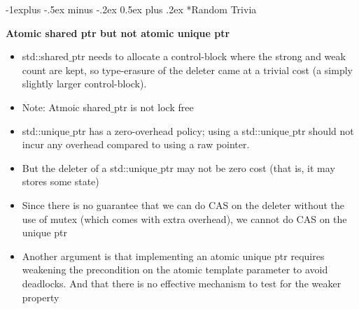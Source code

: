 \documentclass[10pt, landscape]{article}
\makeatletter
\renewcommand{\subsection}{\@startsection{subsection}{2}{0mm}%
                                {-1explus -.5ex minus -.2ex}%
                                {0.5ex plus .2ex}%
                                {\normalfont\normalsize\bfseries}}
\makeatother
\begin{document}
\begin{multicols}{4}
\subsection*{Random Trivia}

\textbf{Atomic shared ptr but not atomic unique ptr} \\
\begin{itemize}
    \item std::shared$\_$ptr needs to allocate a control-block where the strong and weak count are kept, so type-erasure of the deleter came at a trivial cost (a simply slightly larger control-block).
    \item Note: Atmoic shared$\_$ptr is not lock free
    \item std::unique$\_$ptr has a zero-overhead policy; using a std::unique$\_$ptr should not incur any overhead compared to using a raw pointer.
    \item But the deleter of a std::unique$\_$ptr may not be zero cost (that is, it may stores some state)
    \item Since there is no guarantee that we can do CAS on the deleter without the use of mutex (which comes with extra overhead), we cannot do CAS on the unique ptr
    \item Another argument is that implementing an atomic unique ptr requires weakening the precondition on the atomic template parameter to avoid deadlocks. And that there is no effective mechanism to test for the weaker property
\end{itemize}

\end{multicols}
\end{document}
